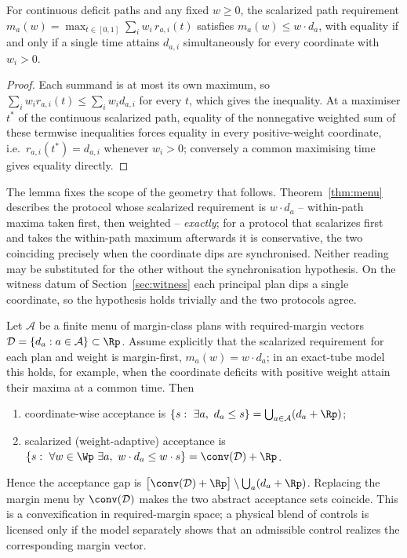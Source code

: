 \begin{lemma}\label{lem:sync}
For continuous deficit paths and any fixed $w\ge0$, the scalarized path requirement $m_a(w)=\max_{t\in[0,1]}\sum_iw_i\,r_{a,i}(t)$ satisfies $m_a(w)\le w\cdot d_a$, with equality if and only if a single time attains $d_{a,i}$ simultaneously for every coordinate with $w_i>0$.
\end{lemma}
\begin{proof}
Each summand is at most its own maximum, so $\sum_iw_ir_{a,i}(t)\le\sum_iw_id_{a,i}$ for every $t$, which gives the inequality. At a maximiser $t^\ast$ of the continuous scalarized path, equality of the nonnegative weighted sum of these termwise inequalities forces equality in every positive-weight coordinate, i.e.\ $r_{a,i}(t^\ast)=d_{a,i}$ whenever $w_i>0$; conversely a common maximising time gives equality directly.
\end{proof}

The lemma fixes the scope of the geometry that follows. Theorem~\ref{thm:menu} describes the protocol whose scalarized requirement is $w\cdot d_a$ -- within-path maxima taken first, then weighted -- \emph{exactly}; for a protocol that scalarizes first and takes the within-path maximum afterwards it is conservative, the two coinciding precisely when the coordinate dips are synchronised. Neither reading may be substituted for the other without the synchronisation hypothesis. On the witness datum of Section~\ref{sec:witness} each principal plan dips a single coordinate, so the hypothesis holds trivially and the two protocols agree.

\begin{theorem}\label{thm:menu}
Let $\mathcal A$ be a finite menu of margin-class plans with required-margin vectors $\mathcal D=\{d_a:a\in\mathcal A\}\subset\Rp$. Assume explicitly that the scalarized requirement for each plan and weight is margin-first, $m_a(w)=w\cdot d_a$; in an exact-tube model this holds, for example, when the coordinate deficits with positive weight attain their maxima at a common time. Then
\begin{enumerate}[label=\textup{(\roman*)},leftmargin=2em]
\item coordinate-wise acceptance is $\{s:\ \exists a,\ d_a\le s\}=\bigcup_{a\in\mathcal A}(d_a+\Rp)$;
\item scalarized (weight-adaptive) acceptance is $\{s:\ \forall w\in\Wp\ \exists a,\ w\cdot d_a\le w\cdot s\}=\conv(\mathcal D)+\Rp$.
\end{enumerate}
Hence the acceptance gap is $\big[\conv(\mathcal D)+\Rp\big]\setminus\bigcup_{a}(d_a+\Rp)$. Replacing the margin menu by $\conv(\mathcal D)$ makes the two abstract acceptance sets coincide. This is a convexification in required-margin space; a physical blend of controls is licensed only if the model separately shows that an admissible control realizes the corresponding margin vector.
\end{theorem}

